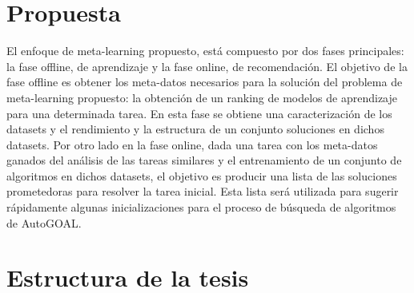 \section*{Propuesta}

El enfoque de meta-learning propuesto, está compuesto por dos fases principales: la fase offline, de aprendizaje y la fase online, de recomendación. El objetivo de la fase offline es obtener los meta-datos necesarios para la solución del problema de meta-learning propuesto: la obtención de un ranking de modelos de aprendizaje para una determinada tarea. En esta fase se obtiene una caracterización de los datasets y el rendimiento y la estructura de un conjunto soluciones en dichos datasets. Por otro lado en la fase online, dada una tarea con los meta-datos ganados del análisis de las tareas similares y el entrenamiento de un conjunto de algoritmos en dichos datasets, el objetivo es producir una lista de las soluciones prometedoras para resolver la tarea inicial. Esta lista será utilizada para sugerir rápidamente algunas inicializaciones para el proceso de búsqueda de algoritmos de AutoGOAL.



\section*{Estructura de la tesis}

%

